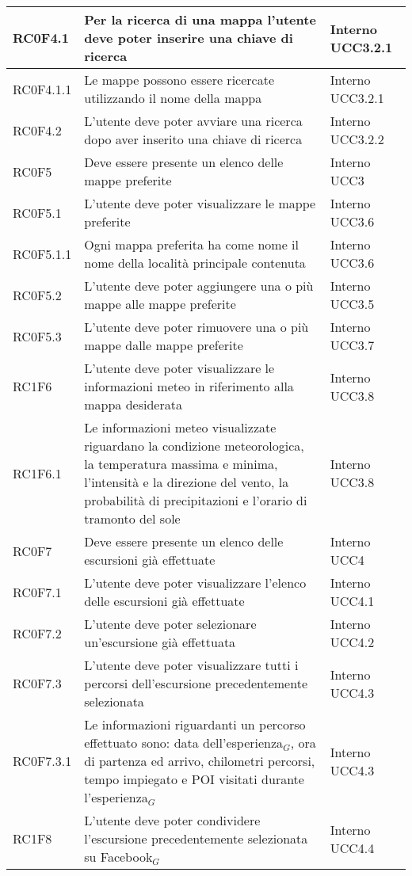 \begin{center}
\begin{longtable}{|l|p{7cm}|p{1.7cm}|}
RC0F4.1		& Per la ricerca di una mappa l'utente deve poter inserire una chiave di ricerca & Interno UCC3.2.1 \\\hline
RC0F4.1.1	& Le mappe possono essere ricercate utilizzando il nome della mappa & Interno UCC3.2.1 \\\hline
RC0F4.2		& L'utente deve poter avviare una ricerca dopo aver inserito una chiave di ricerca & Interno UCC3.2.2 \\\hline
RC0F5 		& Deve essere presente un elenco delle mappe preferite & Interno UCC3 \\\hline
RC0F5.1 	& L'utente deve poter visualizzare le mappe preferite & Interno UCC3.6 \\\hline
RC0F5.1.1	& Ogni mappa preferita ha come nome il nome della località principale contenuta & Interno UCC3.6 \\\hline
RC0F5.2 	& L'utente deve poter aggiungere una o più mappe alle mappe preferite & Interno UCC3.5 \\\hline
RC0F5.3		& L'utente deve poter rimuovere una o più mappe dalle mappe preferite & Interno UCC3.7 \\\hline
RC1F6 		& L'utente deve poter visualizzare le informazioni meteo in riferimento alla mappa desiderata & Interno UCC3.8 \\\hline
RC1F6.1		& Le informazioni meteo visualizzate riguardano la condizione meteorologica, la temperatura massima e minima, l'intensità e la direzione del vento, la probabilità di precipitazioni e l'orario di tramonto del sole & Interno UCC3.8 \\\hline
RC0F7 		& Deve essere presente un elenco delle escursioni già effettuate & Interno UCC4 \\\hline
RC0F7.1		& L'utente deve poter visualizzare l'elenco delle escursioni già effettuate & Interno UCC4.1 \\\hline
RC0F7.2		& L'utente deve poter selezionare un'escursione già effettuata & Interno UCC4.2 \\\hline
RC0F7.3		& L'utente deve poter visualizzare tutti i percorsi dell'escursione precedentemente selezionata & Interno UCC4.3 \\\hline
RC0F7.3.1	& Le informazioni riguardanti un percorso effettuato sono: data dell'esperienza$_{G}$, ora di partenza ed arrivo, chilometri percorsi, tempo impiegato e POI visitati durante l'esperienza$_{G}$ & Interno UCC4.3 \\\hline
RC1F8		& L'utente deve poter condividere l'escursione precedentemente selezionata su Facebook$_{G}$ & Interno UCC4.4 \\\hline

\end{longtable}
\end{center}
